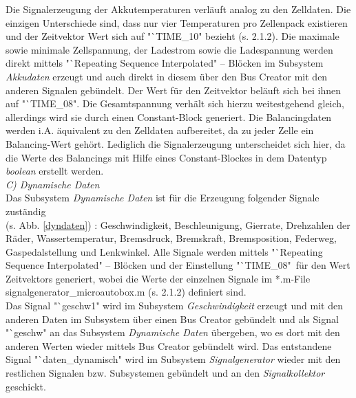 \documentclass[fontsize = 12pt, paper = a4]{scrreprt}
\begin{document}
Die Signalerzeugung der Akkutemperaturen verläuft analog zu den Zelldaten. Die einzigen Unterschiede sind, dass nur vier Temperaturen pro Zellenpack existieren und der Zeitvektor Wert sich auf "`TIME\_10" bezieht (s. 2.1.2). Die maximale sowie minimale Zellspannung, der Ladestrom sowie die Ladespannung werden direkt mittels "`Repeating Sequence Interpolated" -- Blöcken im Subsystem \textit{Akkudaten} erzeugt und auch direkt in diesem über den Bus Creator mit den anderen Signalen gebündelt. Der Wert für den Zeitvektor beläuft sich bei ihnen auf "`TIME\_08". Die Gesamtspannung verhält sich hierzu weitestgehend gleich, allerdings wird sie durch einen Constant-Block generiert. Die Balancingdaten werden i.A. äquivalent zu den Zelldaten aufbereitet, da zu jeder Zelle ein Balancing-Wert gehört. Lediglich die Signalerzeugung unterscheidet sich hier, da die Werte des Balancings mit Hilfe eines Constant-Blockes in dem Datentyp \textit{boolean} erstellt werden. \\

\textit{C) Dynamische Daten} \\

Das Subsystem \textit{Dynamische Daten} ist für die Erzeugung folgender Signale zuständig \\ (s. Abb. \ref{dyndaten}) : Geschwindigkeit, Beschleunigung, Gierrate, Drehzahlen der Räder, Wassertemperatur, Bremsdruck, Bremskraft, Bremsposition, Federweg, Gaspedalstellung und Lenkwinkel. Alle Signale werden mittels "`Repeating Sequence Interpolated" -- Blöcken und der Einstellung "`TIME\_08"\ für den  Wert Zeitvektors generiert, wobei die Werte der einzelnen Signale im *.m-File signalgenerator\_microautobox.m (s. 2.1.2) definiert sind. \\

Das Signal "`geschw1" wird im Subsystem \textit{Geschwindigkeit} erzeugt und mit den anderen Daten im Subsystem über einen Bus Creator gebündelt und als Signal "`geschw" an das Subsystem \textit{Dynamische Daten} übergeben, wo es dort mit den anderen Werten wieder mittels Bus Creator gebündelt wird. Das entstandene Signal "`daten\_dynamisch" wird im Subsystem \textit{Signalgenerator} wieder mit den restlichen Signalen bzw. Subsystemen gebündelt und an den \textit{Signalkollektor} geschickt.

\newpage
\end{document}
